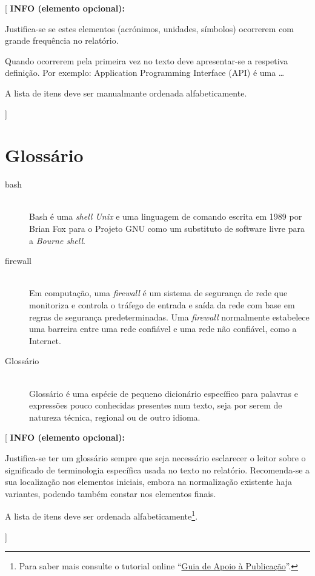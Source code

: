 \documentclass[11pt,a4paper]{report}
\newenvironment{infoopt}[1]{\vspace*{6mm}\color{blue}[ \textbf{INFO (elemento opcional):} \begin{em} #1}{\vspace*{3mm}\end{em} ]}
\begin{document}
\begin{infoopt}
Justifica-se se estes elementos (acrónimos, unidades, símbolos)
ocorrerem com grande frequência no relatório.

Quando ocorrerem pela primeira vez no texto deve apresentar-se a
respetiva definição.
Por exemplo: Application Programming Interface (API) é uma \ldots 

A lista de itens deve ser manualmante ordenada alfabeticamente.
\end{infoopt}


\chapter*{Glossário}

\begin{description}
\item[bash] \hfill \\
  Bash é uma \emph{shell Unix} e uma linguagem de comando escrita 
  em 1989 por Brian Fox para o Projeto GNU como um substituto de 
  software livre para a \emph{Bourne shell}.
\item[firewall] \hfill \\
  Em computação, uma \emph{firewall} é um sistema de segurança de rede 
  que monitoriza e controla o tráfego de entrada e saída da rede 
  com base em regras de segurança predeterminadas.
  Uma \emph{firewall} normalmente estabelece uma barreira entre uma 
  rede confiável e uma rede não confiável, como a Internet.
\item[Glossário] \hfill \\
  Glossário é uma espécie de pequeno dicionário específico para
  palavras e expressões pouco conhecidas presentes num texto, seja
  por serem de natureza técnica, regional ou de outro idioma.
\end{description}

\begin{infoopt}
Justifica-se ter um glossário sempre que seja necessário esclarecer o leitor sobre o significado de terminologia específica usada no texto no relatório.
Recomenda-se a sua localização nos elementos iniciais, embora na
normalização existente haja variantes, podendo também constar nos
elementos finais.

A lista de itens deve ser ordenada alfabeticamente\footnote{%
Para saber mais consulte o tutorial online 
``\href{https://docs.google.com/document/d/1TDC1behVq8x7fQL4CcPEEh_np5GXviJevQxnQ9gbiJs/edit}
{Guia de Apoio à Publicação}''.}.
\end{infoopt}
\end{document}
